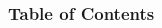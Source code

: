 \begin{frame}

\frametitle{Table of Contents}
\begin{multicols}{2}
  \tableofcontents
\end{multicols}

\end{frame}
